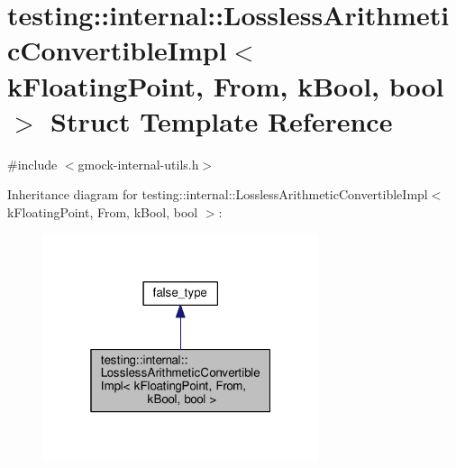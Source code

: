 \hypertarget{structtesting_1_1internal_1_1LosslessArithmeticConvertibleImpl_3_01kFloatingPoint_00_01From_00_01kBool_00_01bool_01_4}{}\section{testing\+:\+:internal\+:\+:Lossless\+Arithmetic\+Convertible\+Impl$<$ k\+Floating\+Point, From, k\+Bool, bool $>$ Struct Template Reference}
\label{structtesting_1_1internal_1_1LosslessArithmeticConvertibleImpl_3_01kFloatingPoint_00_01From_00_01kBool_00_01bool_01_4}


{\ttfamily \#include $<$gmock-\/internal-\/utils.\+h$>$}



Inheritance diagram for testing\+:\+:internal\+:\+:Lossless\+Arithmetic\+Convertible\+Impl$<$ k\+Floating\+Point, From, k\+Bool, bool $>$\+:\nopagebreak
\begin{figure}[H]
\begin{center}
\leavevmode
\includegraphics[width=229pt]{structtesting_1_1internal_1_1LosslessArithmeticConvertibleImpl_3_01kFloatingPoint_00_01From_00_0a3e79c8a275f6dded4e5975142b81d34}
\end{center}
\end{figure}


